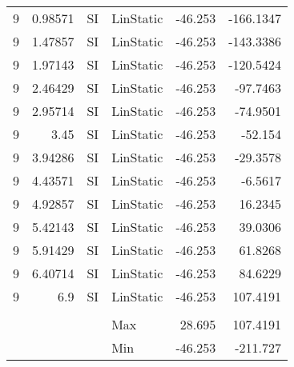 \begin{table}[htbp]
{\begin{tabular}{rrrlrr}
    \multicolumn{1}{l}{9} & 0.98571 & \multicolumn{1}{l}{SI} & LinStatic & -46.253 & -166.1347 \\
    \multicolumn{1}{l}{9} & 1.47857 & \multicolumn{1}{l}{SI} & LinStatic & -46.253 & -143.3386 \\
    \multicolumn{1}{l}{9} & 1.97143 & \multicolumn{1}{l}{SI} & LinStatic & -46.253 & -120.5424 \\
    \multicolumn{1}{l}{9} & 2.46429 & \multicolumn{1}{l}{SI} & LinStatic & -46.253 & -97.7463 \\
    \multicolumn{1}{l}{9} & 2.95714 & \multicolumn{1}{l}{SI} & LinStatic & -46.253 & -74.9501 \\
    \multicolumn{1}{l}{9} & 3.45 & \multicolumn{1}{l}{SI} & LinStatic & -46.253 & -52.154 \\
    \multicolumn{1}{l}{9} & 3.94286 & \multicolumn{1}{l}{SI} & LinStatic & -46.253 & -29.3578 \\
    \multicolumn{1}{l}{9} & 4.43571 & \multicolumn{1}{l}{SI} & LinStatic & -46.253 & -6.5617 \\
    \multicolumn{1}{l}{9} & 4.92857 & \multicolumn{1}{l}{SI} & LinStatic & -46.253 & 16.2345 \\
    \multicolumn{1}{l}{9} & 5.42143 & \multicolumn{1}{l}{SI} & LinStatic & -46.253 & 39.0306 \\
    \multicolumn{1}{l}{9} & 5.91429 & \multicolumn{1}{l}{SI} & LinStatic & -46.253 & 61.8268 \\
    \multicolumn{1}{l}{9} & 6.40714 & \multicolumn{1}{l}{SI} & LinStatic & -46.253 & 84.6229 \\
    \multicolumn{1}{l}{9} & 6.9 & \multicolumn{1}{l}{SI} & LinStatic & -46.253 & 107.4191 \\
        &     &     &     &     &  \\
        &     &     & Max & 28.695 & 107.4191 \\
        &     &     & Min & -46.253 & -211.727 \\
    \end{tabular}%
  \label{tab:addlabel}%
  }
\end{table}%
